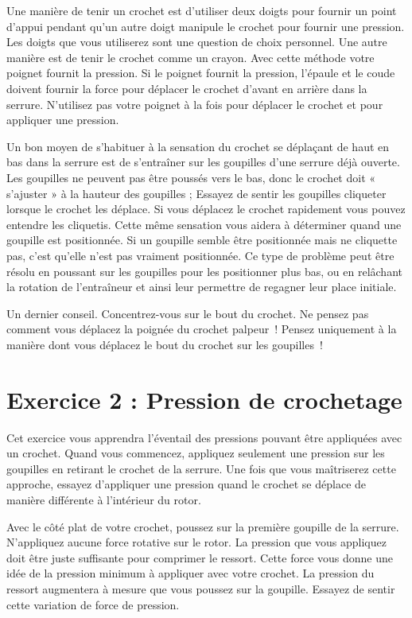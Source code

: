 \documentclass[a4paper,french,11pt,twoside]{report}
\begin{document}
Une manière de tenir un crochet est d'utiliser deux doigts pour fournir un point d'appui pendant qu'un autre doigt manipule le crochet pour fournir une pression. Les doigts que vous utiliserez sont une question de choix personnel. Une autre manière est de tenir le crochet comme un crayon. Avec cette méthode votre poignet fournit la pression. Si le poignet fournit la pression, l'épaule et le coude doivent fournir la force pour déplacer le crochet d'avant en arrière dans la serrure. N'utilisez pas votre poignet à la fois pour déplacer le crochet et pour appliquer une pression.

Un bon moyen de s'habituer à la sensation du crochet se déplaçant de haut en bas dans la serrure est de s'entraîner sur les goupilles d'une serrure déjà ouverte. Les goupilles ne peuvent pas être poussés vers le bas, donc le crochet doit « s'ajuster » à la hauteur des goupilles ; Essayez de sentir les goupilles cliqueter lorsque le crochet les déplace. Si vous déplacez le crochet rapidement vous pouvez entendre les cliquetis. Cette même sensation vous aidera à déterminer quand une goupille est positionnée. Si un goupille semble être positionnée mais ne cliquette pas, c'est qu'elle n'est pas vraiment positionnée. Ce type de problème peut être résolu en poussant sur les goupilles pour les positionner plus bas, ou en relâchant la rotation de l'entraîneur et ainsi leur permettre de regagner leur place initiale.

Un dernier conseil. Concentrez-vous sur le bout du crochet. Ne pensez pas comment vous déplacez la poignée du crochet palpeur~! Pensez uniquement à la manière dont vous déplacez le bout du crochet sur les goupilles~!

\section{Exercice 2 : Pression de crochetage}

Cet exercice vous apprendra l'éventail des pressions pouvant être appliquées avec un crochet. Quand vous commencez, appliquez seulement une pression sur les goupilles en retirant le crochet de la serrure. Une fois que vous maîtriserez cette approche, essayez d'appliquer une pression quand le crochet se déplace de manière différente à l'intérieur du rotor.

Avec le côté plat de votre crochet, poussez sur la première goupille de la serrure. N'appliquez aucune force rotative sur le rotor. La pression que vous appliquez doit être juste suffisante pour comprimer le ressort. Cette force vous donne une idée de la pression minimum à appliquer avec votre crochet. La pression du ressort augmentera à mesure que vous poussez sur la goupille. Essayez de sentir cette variation de force de pression.
\end{document}
